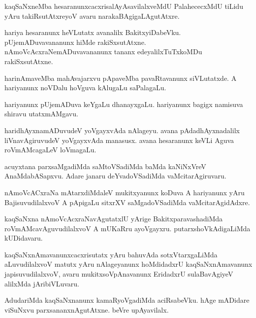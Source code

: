 \documentclass{article}
\begin{document}
\begin{mn}
kaqSaNxneMba hesaranunxcacxrisalAyAsavilalxveMdU PalahececxMdU tiLidu yAru takiRsutAtxreyoV avaru
narakaBAgigaLAgutAtxre. 
\end{mn}

\begin{mn}
hariya hesaranunx heVLutatx avanalilx BakitxyiDabeVku. pUjemADuvavananunx hiMde rakiSxsutAtxne. 
nAmoVcAcxraNemADuvavananunx tananx edeyalilxTuTxkoMDu rakiSxsutAtxne.
\end{mn}

\begin{mn}
harinAmaveMba mahAvajarxvu pApaveMba pavaRtavanunx siVLutatxde. A hariyanunx noVDalu hoVguva 
kAlugaLu saPalagaLu.
\end{mn}

\begin{mn}
hariyanunx pUjemADuva keYgaLu dhanayxgaLu. hariyanunx bagigx namisuva shiravu utatxmAMgavu.
\end{mn}

\begin{mn}
haridhAyxnamADuvudeV yoVgayxvAda nAlageyu. avana pAdadhAyxnadalilx liVnavAgiruvudeV yoVgayxvAda 
manasusx. avana hesaranunx keVLi Aguva roVmAMcagaLeV loVmagaLu.
\end{mn}

\begin{mn}
acuyxtana parxsaMgadiMda saMtoVSadiMda baMda kaNiNxVreV AnaMdabASapxvu. Adare janaru 
deYvadoVSadiMda vaMcitarAgiruvaru.
\end{mn}

\begin{mn}
nAmoVcACxraNa mAtarxdiMdaleV mukitxyanunx koDuva A hariyanunx yAru BajisuvudilalxvoV A pApigaLu 
sitxrXV saMgadoVSadiMda vaMcitarAgidAdxre.
\end{mn}

\begin{mn}
kaqSaNxna nAmoVcAcxraNavAgutatxlU yArige BakitxparavashadiMda roVmAMcavAguvudilalxvoV A mUKaRru 
ayoVgayxru. putarxshoVkAdigaLiMda kUDidavaru.
\end{mn}

\begin{mn}
kaqSaNxnAmavanunxcacxrisutatx yAru bahuvAda sotxVtarxgaLiMda aLuvudilalxvoV matutx yAru nAlageyanunx
hoMdidadxrU kaqSaNxnAmavanunx japisuvudilalxvoV, avaru mukitxsoVpAnavanunx EridadxrU 
sulaBavAgiyeV alilxMda jAribiVLuvaru.
\end{mn}

\begin{mn}
AdudariMda kaqSaNxnanunx kamaRyoVgadiMda aciRsabeVku. hAge mADidare viSuNxvu 
parxsananxnAgutAtxne. beVre upAyavilalx.
\end{mn}
\end{document}
